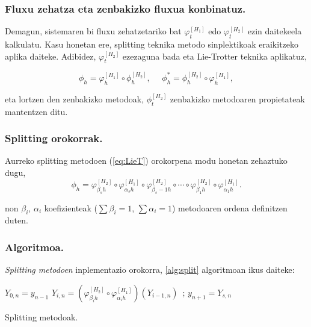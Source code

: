 \subsubsection*{Fluxu zehatza eta zenbakizko fluxua konbinatuz.}
Demagun, sistemaren bi fluxu zehatzetariko bat $\varphi_t^{[H_1]}$ edo $\varphi_t^{[H_2]}$ ezin daitekeela kalkulatu. Kasu honetan ere, splitting teknika  metodo sinplektikoak eraikitzeko aplika daiteke. Adibidez, $\varphi_t^{[H_2]}$ ezezaguna bada eta Lie-Trotter teknika aplikatuz,

\begin{equation*}
\phi_h=\varphi_h^{[H_1]} \circ \phi_h^{[H_2]}, \ \ \ \ \ \  \phi_h^{*}=\phi_h^{[H_2]} \circ \varphi_h^{[H_1]},
\end{equation*}

eta lortzen den zenbakizko metodoak, $\phi_t^{[H_2]}$ zenbakizko metodoaren propietateak mantentzen ditu. 

\subsubsection*{Splitting orokorrak.}

Aurreko splitting metodoen (\ref{eq:LieT}) orokorpena modu honetan zehaztuko dugu,
\begin{equation}
\phi_h = \varphi_{\beta_s h}^{[H_2]} \circ \varphi_{\alpha_s h}^{[H_1]} \circ \varphi_{\beta_s-1 h}^{[H_2]} 
\circ \cdots \circ \varphi_{\beta_1 h}^{[H_2]} \circ \varphi_{\alpha_1 h}^{[H_1]} .
\end{equation}

non $\beta_i$, $\alpha_i$ koefizienteak ($\sum \beta_i=1$, $\sum \alpha_i=1$) metodoaren ordena definitzen duten.


\subsubsection*{Algoritmoa.}

\emph{Splitting metodoen} inplementazio orokorra, \ref{alg:split} algoritmoan ikus daiteke:

\begin{algorithm}[H]
 \BlankLine
  {
   \BlankLine
    $Y_{0,n}=y_{n-1} $\;
    \BlankLine
   {
    \BlankLine 
    $Y_{i,n}=(\varphi^{[H_2]}_{\beta_i h} \circ \varphi^{[H_1]}_{\alpha_i h})(Y_{i-1,n})$\ ;
   }
   \BlankLine
    $y_{n+1}=Y_{s,n}$\;
   \BlankLine
 }
 \caption{Splitting metodoak.}
 \label{alg:split}
\end{algorithm}

